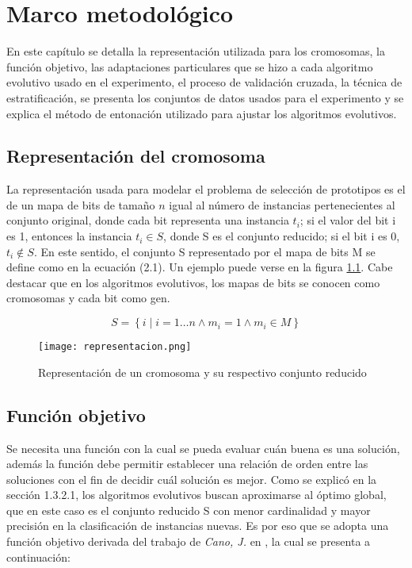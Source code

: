\chapter{Marco metodológico}
\label{capitulo2}

En este capítulo se detalla la representación utilizada para los cromosomas, la función objetivo, las adaptaciones particulares que se hizo a cada algoritmo evolutivo usado en el experimento, el proceso de validación cruzada, la técnica de estratificación, se presenta los conjuntos de datos usados para el experimento y se explica el método de entonación utilizado para ajustar los algoritmos evolutivos.

\section{Representación del cromosoma}

La representación usada para modelar el problema de selección de prototipos es el de un mapa de bits de tamaño $n$ igual al número de instancias pertenecientes al conjunto original, donde cada bit representa una instancia $t_i$; si el valor del bit i es 1, entonces la instancia $t_i \in S$, donde S es el conjunto reducido; si el bit i es 0, $t_i \notin S$. En este sentido, el conjunto S representado por el mapa de bits M se define como en la ecuación (2.1). Un ejemplo puede verse en la figura \ref{representacion}. Cabe destacar que en los algoritmos evolutivos, los mapas de bits se conocen como cromosomas y cada bit como gen.

\begin{equation}
S = \left\{ i \mid i = 1 \dots n \land m_i = 1 \land m_i \in M \right\}
\end{equation} 

\begin{figure}[]
\centering
\texttt{[image: representacion.png]}
\caption[Representación de un cromosoma y su respectivo conjunto reducido]{Representación de un cromosoma y su respectivo conjunto reducido}
\label{representacion}
\end{figure}

\section{Función objetivo}

Se necesita una función con la cual se pueda evaluar cuán buena es una solución, además la función debe permitir establecer una relación de orden entre las soluciones con el fin de decidir cuál solución es mejor. Como se explicó en la sección 1.3.2.1, los algoritmos evolutivos buscan aproximarse al óptimo global, que en este caso es el conjunto reducido S con menor cardinalidad y mayor precisión en la clasificación de instancias nuevas. Es por eso que se adopta una función objetivo derivada del trabajo de \emph{Cano, J.} en \cite{de2004reduccion}, la cual se presenta a continuación:

